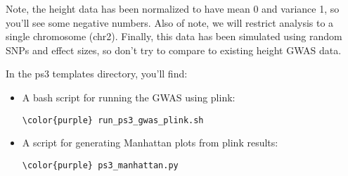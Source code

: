 \documentclass[12pt]{article}
\begin{document}
Note, the height data has been normalized to have mean 0 and variance 1, so you'll see some negative numbers. Also of note, we will restrict analysis to a single chromosome (chr2). Finally, this data has been simulated using random SNPs and effect sizes, so don't try to compare to existing height GWAS data.
	
In the ps3 templates directory, you'll find:

\begin{itemize}
\item A bash script for running the GWAS using plink:
\begin{Verbatim}[commandchars=\\\{\}]
\color{purple} run_ps3_gwas_plink.sh
\end{Verbatim}

\item A script for generating Manhattan plots from plink results:
\begin{Verbatim}[commandchars=\\\{\}]
\color{purple} ps3_manhattan.py
\end{Verbatim}
\end{itemize}


\end{document}
